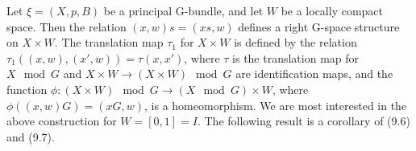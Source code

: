Let $\xi = (X, p, B)$ be a principal G-bundle, and let $W$ be a locally compact space. Then the relation $(x, w)s = (xs, w)$ defines a right G-space structure on $X \times W$. The translation map $\tau_1$ for $X \times W$ is defined by the relation $\tau_1((x, w), (x', w)) = \tau(x, x')$, where $\tau$ is the translation map for $X \mod G$ and $X \times W \rightarrow (X \times W) \mod G$ are identification maps, and the function $\phi: (X \times W) \mod G \rightarrow (X \mod G) \times W$, where $\phi((x, w)G) = (xG, w)$, is a homeomorphism. We are most interested in the above construction for $W = [0, 1] = I$. The following result is a corollary of (9.6) and (9.7).
